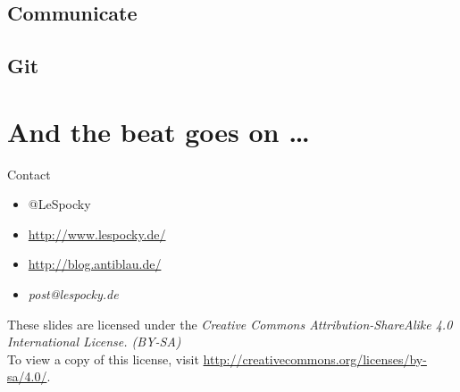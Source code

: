 \documentclass{beamer}
\begin{document}
\subsection{Communicate}

\subsection{Git}

\section*{And the beat goes on \dots}

\begin{frame}{Contact}
    \begin{itemize}
        \item @LeSpocky
        \item \url{http://www.lespocky.de/}
        \item \url{http://blog.antiblau.de/}
        \item \emph{post@lespocky.de}
    \end{itemize}

    \vspace{1em}
    \small
    These slides are licensed under the \emph{Creative Commons
    Attribution-ShareAlike 4.0 International License. (BY-SA)} \\
    To view a copy of this license, visit
    \url{http://creativecommons.org/licenses/by-sa/4.0/}.
    \normalsize
\end{frame}
\end{document}
